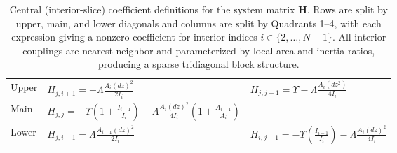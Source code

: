 \documentclass[linenumbers]{aastex7}
\begin{document}
\begin{table}[htbp]
{\begin{tabular}{|p{}|p{}|p{}|}
			\hline \hline
			Upper
			                  & $\displaystyle H_{j,i+1} = -\Lambda \frac{A_i(dz)^2}{2I_i}$
			                  & $\displaystyle H_{j, j+1} = \Upsilon - \Lambda \frac{A_i (dz^2)}{4I_i}$
			\\
			Main
			                  & $\displaystyle H_{j, j} = -\Upsilon\left(1 + \frac{I_{i-1}}{I_i}\right) - \Lambda\frac{A_i (dz)^2}{4I_i}\left(1+\frac{A_{i-1}}{A_i}\right) $
			\\
			Lower
			                  & $\displaystyle H_{j,i-1} = \Lambda \frac{A_{i-1}(dz)^2}{2I_i}$
			                  & $\displaystyle H_{i, j-1} = -\Upsilon\left(\frac{I_{i-1}}{I_i}\right) - \Lambda\frac{A_i (dz)^2}{4I_i}$

			\\
			\hline
		\end{tabular}
	}
	\caption{Central (interior-slice) coefficient definitions for the system matrix $\mathbf{H}$. Rows are split by upper, main, and lower diagonals and columns are split by Quadrants 1--4, with each expression giving a nonzero coefficient for interior indices $i\in\{2,\dots,N-1\}$. All interior couplings are nearest-neighbor and parameterized by local area and inertia ratios, producing a sparse tridiagonal block structure.}
	\label{tab:Hcomps}
\end{table}
\end{document}
